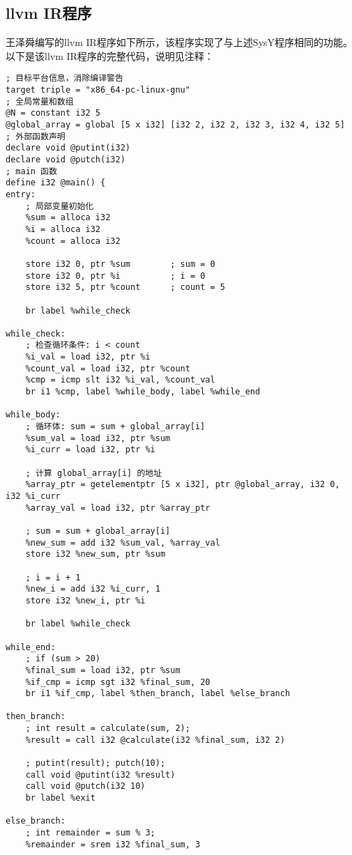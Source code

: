 \documentclass[a4paper]{article}
\begin{document}
\subsection{llvm IR程序}
王泽舜编写的llvm IR程序如下所示，该程序实现了与上述SysY程序相同的功能。
以下是该llvm IR程序的完整代码，说明见注释：
\begin{lstlisting}[language=text,caption={test\_new.ll}]
; 目标平台信息，消除编译警告
target triple = "x86_64-pc-linux-gnu"
; 全局常量和数组
@N = constant i32 5
@global_array = global [5 x i32] [i32 2, i32 2, i32 3, i32 4, i32 5]
; 外部函数声明
declare void @putint(i32)
declare void @putch(i32)
; main 函数
define i32 @main() {
entry:
    ; 局部变量初始化
    %sum = alloca i32
    %i = alloca i32
    %count = alloca i32
    
    store i32 0, ptr %sum        ; sum = 0
    store i32 0, ptr %i          ; i = 0
    store i32 5, ptr %count      ; count = 5
    
    br label %while_check

while_check:
    ; 检查循环条件: i < count
    %i_val = load i32, ptr %i
    %count_val = load i32, ptr %count
    %cmp = icmp slt i32 %i_val, %count_val
    br i1 %cmp, label %while_body, label %while_end

while_body:
    ; 循环体: sum = sum + global_array[i]
    %sum_val = load i32, ptr %sum
    %i_curr = load i32, ptr %i
    
    ; 计算 global_array[i] 的地址
    %array_ptr = getelementptr [5 x i32], ptr @global_array, i32 0, i32 %i_curr
    %array_val = load i32, ptr %array_ptr
    
    ; sum = sum + global_array[i]
    %new_sum = add i32 %sum_val, %array_val
    store i32 %new_sum, ptr %sum
    
    ; i = i + 1
    %new_i = add i32 %i_curr, 1
    store i32 %new_i, ptr %i
    
    br label %while_check

while_end:
    ; if (sum > 20)
    %final_sum = load i32, ptr %sum
    %if_cmp = icmp sgt i32 %final_sum, 20
    br i1 %if_cmp, label %then_branch, label %else_branch

then_branch:
    ; int result = calculate(sum, 2);
    %result = call i32 @calculate(i32 %final_sum, i32 2)
    
    ; putint(result); putch(10);
    call void @putint(i32 %result)
    call void @putch(i32 10)
    br label %exit

else_branch:
    ; int remainder = sum % 3;
    %remainder = srem i32 %final_sum, 3
    

\end{lstlisting}
\end{document}
